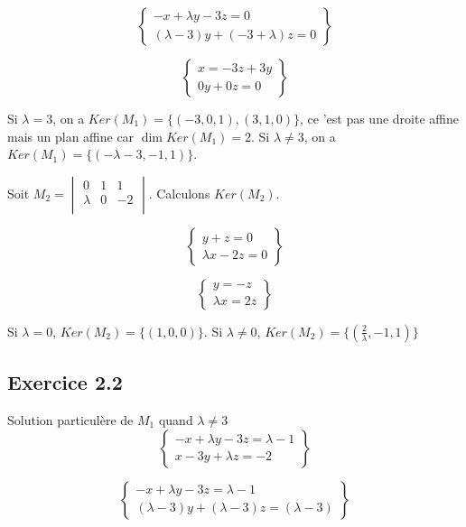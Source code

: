\documentclass[]{book}
\theoremstyle{definition}
\begin{document}
$$
\left\{ 
    \begin{array}{l}
        -x + \lambda y - 3 z = 0 \\
        (\lambda - 3) y + (-3 +\lambda) z = 0
    \end{array}
\right\}
$$

$$
\left\{ 
    \begin{array}{l}
        x  = -3z+3y \\
        0y + 0z= 0
    \end{array}
\right\}
$$

Si $\lambda = 3$, on a $Ker(M_1) = \{(-3, 0, 1), (3, 1, 0)\}$, ce 'est pas une droite affine mais un plan affine car $\dim Ker(M_1) = 2$. Si $\lambda \neq 3$, on a $Ker(M_1) = \{(-\lambda -3, -1, 1)\}$. 

Soit $M_2=\begin{vmatrix}
    0 & 1 & 1 \\
    \lambda & 0 & -2 \\
\end{vmatrix}$. Calculons $Ker(M_2)$.

$$
\left\{ 
    \begin{array}{l}
        y + z = 0 \\
        \lambda x - 2 z = 0
    \end{array}
\right\}
$$

$$
\left\{ 
    \begin{array}{l}
        y = -z \\
        \lambda x = 2 z
    \end{array}
\right\}
$$

Si $\lambda = 0$, $Ker(M_2) =\{(1,0,0) \}$. Si $\lambda \neq 0$, $Ker(M_2) =\{(\frac{2}{\lambda},-1,1) \}$

\subsection*{Exercice 2.2}
Solution particul\`ere de $M_1$ quand $\lambda \neq 3$
$$
\left\{ 
    \begin{array}{l}
        -x + \lambda y - 3 z = \lambda - 1 \\
        x - 3 y + \lambda z = -2
    \end{array}
\right\}
$$

$$
\left\{ 
    \begin{array}{l}
        -x + \lambda y - 3 z = \lambda - 1 \\
        (\lambda - 3) y + (\lambda - 3) z = (\lambda - 3)
    \end{array}
\right\}
$$
\end{document}

